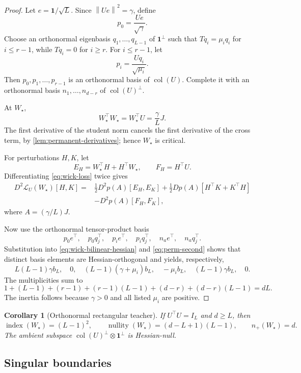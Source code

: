 \documentclass[11pt]{article}
\newtheorem{corollary}[theorem]{Corollary}
\newcommand{\one}{\mathbf{1}}
\newcommand{\ind}{\operatorname{index}}
\newcommand{\nul}{\operatorname{nullity}}
\newcommand{\col}{\operatorname{col}}
\newcommand{\norm}[1]{\left\lVert #1\right\rVert}
\begin{document}
\begin{proof}
Let $e=\one/\sqrt L$.  Since $\norm{Ue}^2=\gamma$, define
\[
p_0=\frac{Ue}{\sqrt\gamma}.
\]
Choose an orthonormal eigenbasis $q_1,\ldots,q_{L-1}$ of $\one^\perp$ such that $Tq_i=\mu_iq_i$ for $i\leq r-1$, while $Tq_i=0$ for $i\geq r$.  For $i\leq r-1$, let
\[
p_i=\frac{Uq_i}{\sqrt{\mu_i}}.
\]
Then $p_0,p_1,\ldots,p_{r-1}$ is an orthonormal basis of $\col(U)$.  Complete it with an orthonormal basis $n_1,\ldots,n_{d-r}$ of $\col(U)^\perp$.

At $W_\star$,
\[
W_\star^\top W_\star=W_\star^\top U=\frac{\gamma}{L}J.
\]
The first derivative of the student norm cancels the first derivative of the cross term, by \cref{lem:permanent-derivatives}; hence $W_\star$ is critical.

For perturbations $H,K$, let
\[
E_H=W_\star^\top H+H^\top W_\star,
\qquad F_H=H^\top U.
\]
Differentiating \eqref{eq:wick-loss} twice gives
\begin{align}
D^2\mathcal L_U(W_\star)[H,K]
={}&\frac12D^2p(A)[E_H,E_K]
+\frac12Dp(A)[H^\top K+K^\top H]\nonumber\\
&-D^2p(A)[F_H,F_K],
\label{eq:wick-bilinear-hessian}
\end{align}
where $A=(\gamma/L)J$.

Now use the orthonormal tensor-product basis
\[
p_0e^\top,
\quad p_0q_j^\top,
\quad p_ie^\top,
\quad p_iq_j^\top,
\quad n_ae^\top,
\quad n_aq_j^\top.
\]
Substitution into \eqref{eq:wick-bilinear-hessian} and \eqref{eq:perm-second} shows that distinct basis elements are Hessian-orthogonal and yields, respectively,
\[
L(L-1)\gamma b_L,
\quad0,
\quad(L-1)(\gamma+\mu_i)b_L,
\quad-\mu_i b_L,
\quad(L-1)\gamma b_L,
\quad0.
\]
The multiplicities sum to
\[
1+(L-1)+(r-1)+(r-1)(L-1)+(d-r)+(d-r)(L-1)=dL.
\]
The inertia follows because $\gamma>0$ and all listed $\mu_i$ are positive.
\end{proof}

\begin{corollary}[Orthonormal rectangular teacher]
\label{cor:wick-orthonormal}
If $U^\top U=I_L$ and $d\geq L$, then
\[
\ind(W_\star)=(L-1)^2,
\qquad
\nul(W_\star)=(d-L+1)(L-1),
\qquad n_+(W_\star)=d.
\]
The ambient subspace $\col(U)^\perp\otimes\one^\perp$ is Hessian-null.
\end{corollary}

\subsection{Singular boundaries}
\end{document}
